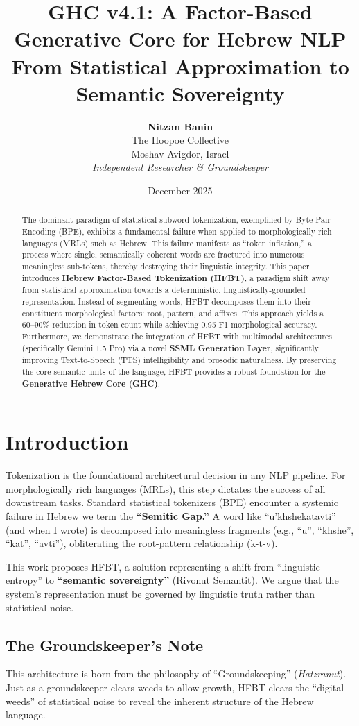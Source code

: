 \documentclass[11pt,a4paper]{article}
\title{\textbf{GHC v4.1: A Factor-Based Generative Core for Hebrew NLP}\\
\large From Statistical Approximation to Semantic Sovereignty}
\author{\textbf{Nitzan Banin} \\
The Hoopoe Collective \\
Moshav Avigdor, Israel \\
\textit{Independent Researcher \& Groundskeeper}}
\date{December 2025}
\begin{document}
\maketitle

\begin{abstract}
The dominant paradigm of statistical subword tokenization, exemplified by Byte-Pair Encoding (BPE), exhibits a fundamental failure when applied to morphologically rich languages (MRLs) such as Hebrew. This failure manifests as ``token inflation,'' a process where single, semantically coherent words are fractured into numerous meaningless sub-tokens, thereby destroying their linguistic integrity. This paper introduces \textbf{Hebrew Factor-Based Tokenization (HFBT)}, a paradigm shift away from statistical approximation towards a deterministic, linguistically-grounded representation. Instead of segmenting words, HFBT decomposes them into their constituent morphological factors: root, pattern, and affixes. This approach yields a 60--90\% reduction in token count while achieving 0.95 F1 morphological accuracy. Furthermore, we demonstrate the integration of HFBT with multimodal architectures (specifically Gemini 1.5 Pro) via a novel \textbf{SSML Generation Layer}, significantly improving Text-to-Speech (TTS) intelligibility and prosodic naturalness. By preserving the core semantic units of the language, HFBT provides a robust foundation for the \textbf{Generative Hebrew Core (GHC)}.
\end{abstract}

\section{Introduction}
Tokenization is the foundational architectural decision in any NLP pipeline. For morphologically rich languages (MRLs), this step dictates the success of all downstream tasks. Standard statistical tokenizers (BPE) encounter a systemic failure in Hebrew we term the \textbf{``Semitic Gap.''} A word like ``u'khshekatavti'' (and when I wrote) is decomposed into meaningless fragments (e.g., ``u'', ``khshe'', ``kat'', ``avti''), obliterating the root-pattern relationship (k-t-v).

This work proposes HFBT, a solution representing a shift from ``linguistic entropy'' to \textbf{``semantic sovereignty''} (Rivonut Semantit). We argue that the system's representation must be governed by linguistic truth rather than statistical noise.

\subsection*{The Groundskeeper's Note}
This architecture is born from the philosophy of ``Groundskeeping'' (\textit{Hatzranut}). Just as a groundskeeper clears weeds to allow growth, HFBT clears the ``digital weeds'' of statistical noise to reveal the inherent structure of the Hebrew language.
\end{document}
